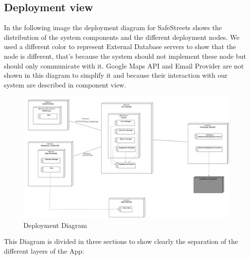\subsection{Deployment view}
In the following image the deployment diagram for SafeStreets shows the distribution of the system components and the different deployment nodes. We used a different color to represent External Database servers to show that the node is different, that's because the system should not implement these node but should only communicate with it.
Google Maps API and Email Provider are not shown in this diagram to simplify it and because their interaction with our system are described in component view.
\newline
\begin{figure}[H]
\centering
\includegraphics[width=\textwidth]{Images/Deployment.png}
\caption{\label{fig:ComWI} Deployment Diagram}
\end{figure}
This Diagram is divided in three sections to show clearly the separation of the different layers of the App:
